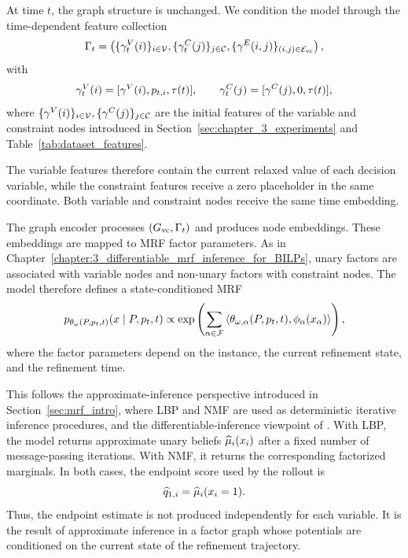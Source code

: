 At time $t$, the graph structure is unchanged. We condition the model through the time-dependent feature collection
\begin{equation}
    \Gamma_t
    =
    \left(
    \{\gamma^V_t(i)\}_{i\in\mathcal{V}},
    \{\gamma^C_t(j)\}_{j\in\mathcal{C}},
    \{\gamma^E(i,j)\}_{(i,j)\in\mathcal{E}_{\mathrm{vc}}}
    \right),
\end{equation}
with
\begin{equation}
    \gamma^V_t(i) = [\gamma^V(i), p_{t,i}, \tau(t)],
    \qquad
    \gamma^C_t(j) = [\gamma^C(j), 0, \tau(t)],
    \label{eq:flow_state_conditioned_features}
\end{equation}
where $\{ \gamma^V(i) \}_{i\in \mathcal{V}}, \{ \gamma^C(j) \}_{j\in\mathcal{C}}$ are the initial features of the variable and constraint nodes introduced in Section~\ref{sec:chapter_3_experiments} and Table~\ref{tab:dataset_features}.

The variable features therefore contain the current relaxed value of each decision variable, while the constraint features receive a zero placeholder in the same coordinate. Both variable and constraint nodes receive the same time embedding.

The graph encoder processes $(G_{\mathrm{vc}},\Gamma_t)$ and produces node embeddings. These embeddings are mapped to MRF factor parameters. As in Chapter~\ref{chapter:3_differentiable_mrf_inference_for_BILPs}, unary factors are associated with variable nodes and non-unary factors with constraint nodes. The model therefore defines a state-conditioned MRF
\begin{equation}
    p_{\theta_{\omega}(P,p_t,t)}(x\mid P,p_t,t)
    \propto
    \exp\left(
        \sum_{\alpha\in\mathcal{F}}
        \left\langle
            \theta_{\omega,\alpha}(P,p_t,t),
            \phi_{\alpha}(x_{\alpha})
        \right\rangle
    \right),
    \label{eq:flow_time_dependent_mrf}
\end{equation}
where the factor parameters depend on the instance, the current refinement state, and the refinement time.

This follows the approximate-inference perspective introduced in Section~\ref{sec:mrf_intro}, where LBP and NMF are used as deterministic iterative inference procedures, and the differentiable-inference viewpoint of \citet{domke_learning_2013}. With LBP, the model returns approximate unary beliefs $\widehat{\mu}_i(x_i)$ after a fixed number of message-passing iterations. With NMF, it returns the corresponding factorized marginals. In both cases, the endpoint score used by the rollout is
\begin{equation}
    \widehat q_{1,i}
    =
    \widehat{\mu}_i(x_i=1).
    \label{eq:flow_score_from_marginal}
\end{equation}
Thus, the endpoint estimate is not produced independently for each variable. It is the result of approximate inference in a factor graph whose potentials are conditioned on the current state of the refinement trajectory.

